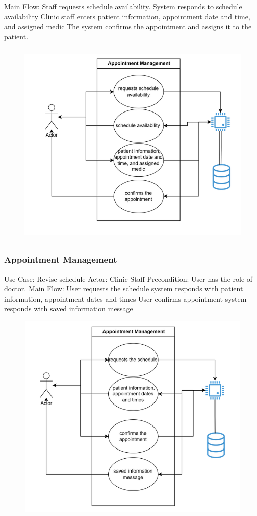 \documentclass{scrreprt}
\begin{document}
	Main Flow:
	Staff requests schedule availability. 
	System responds to schedule availability 
	Clinic staff enters patient information, appointment date and time, and assigned medic
	The system confirms the appointment and assigns it to the patient.
	\begin{figure}[h]
		\begin{center}
			\includegraphics[width=350pt,height=280pt]{usuario3.png}
		\end{center}
		\label{fig:Use case 3}
	\end{figure}
	\pagebreak
	\subsubsection{Appointment Management}
	Use Case: Revise schedule
	Actor: Clinic Staff
	Precondition: User has the role of doctor. 
	Main Flow:
	User requests the schedule
	system responds with patient information, appointment dates and times
	User confirms appointment 
	system responds with saved information message
	
	\begin{figure}[h]
		\begin{center}
			\includegraphics[width=350pt,height=280pt]{usuario4.png}
		\end{center}
		\label{fig:Use case 4}
	\end{figure}
	\pagebreak
\end{document}
